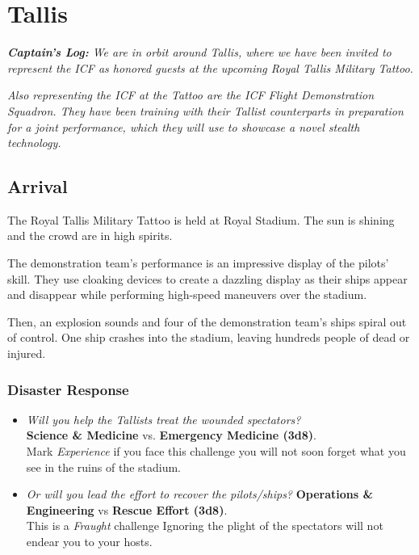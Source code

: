 \documentclass[11pt, a5paper, parskip=half-, DIV=12]{scrartcl}
\begin{document}
\section*{Tallis}
\textit{\textbf{Captain's Log:} We are in orbit around Tallis, where we have been invited to represent the ICF as honored guests at the upcoming Royal Tallis Military Tattoo.}

\textit{Also representing the ICF at the Tattoo are the ICF Flight Demonstration Squadron. They have been training with their Tallist counterparts in preparation for a joint performance, which they will use to showcase a novel stealth technology.}


\subsection*{Arrival}
The Royal Tallis Military Tattoo is held at Royal Stadium. The sun is shining and the crowd are in high spirits.%

The demonstration team's performance is an impressive display of the pilots' skill. They use cloaking devices to create a dazzling display as their ships appear and disappear while performing high-speed maneuvers over the stadium.

Then, an explosion sounds and four of the demonstration team's ships spiral out of control. One ship crashes into the stadium, leaving hundreds people of dead or injured.

\subsubsection*{Disaster Response}
\begin{itemize}
	\item \textit{Will you help the Tallists treat the wounded spectators?} \\ \textbf{Science \& Medicine} vs. \textbf{Emergency Medicine (3d8)}. \\ Mark \textit{Experience} if you face this challenge \textendash{} you will not soon forget what you see in the ruins of the stadium.
	\item \textit{Or will you lead the effort to recover the pilots/ships?} \textbf{Operations \& Engineering} vs \textbf{Rescue Effort (3d8)}.  \\ This is a \textit{Fraught} challenge \textendash{} Ignoring the plight of the spectators will not endear you to your hosts.
\end{itemize}
\end{document}
